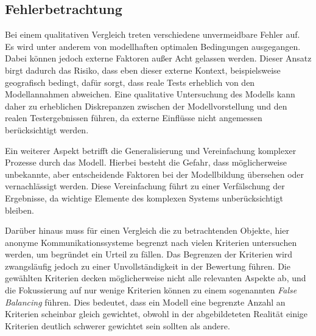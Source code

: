 \subsection{Fehlerbetrachtung}

Bei einem qualitativen Vergleich treten verschiedene unvermeidbare Fehler auf. Es wird unter anderem von modellhaften optimalen Bedingungen ausgegangen. Dabei können jedoch externe Faktoren außer Acht gelassen werden. Dieser Ansatz birgt dadurch das Risiko, dass eben dieser externe Kontext, beispielsweise geografisch bedingt, dafür sorgt, dass reale Tests erheblich von den Modellannahmen abweichen. Eine qualitative Untersuchung des Modells kann daher zu erheblichen Diskrepanzen zwischen der Modellvorstellung und den realen Testergebnissen führen, da externe Einflüsse nicht angemessen berücksichtigt werden.

Ein weiterer Aspekt betrifft die Generalisierung und Vereinfachung komplexer Prozesse durch das Modell. Hierbei besteht die Gefahr, dass möglicherweise unbekannte, aber entscheidende Faktoren bei der Modellbildung übersehen oder vernachlässigt werden. Diese Vereinfachung führt zu einer Verfälschung der Ergebnisse, da wichtige Elemente des komplexen Systems unberücksichtigt bleiben\cite{DisadvantagesOfQualitativApproaches}.

Darüber hinaus muss für einen Vergleich die zu betrachtenden Objekte, hier anonyme Kommunikationssysteme begrenzt nach vielen Kriterien untersuchen werden, um begründet ein Urteil zu fällen. Das Begrenzen der Kriterien wird zwangsläufig jedoch zu einer Unvollständigkeit in der Bewertung führen. Die gewählten Kriterien decken möglicherweise nicht alle relevanten Aspekte ab, und die Fokussierung auf nur wenige Kriterien können zu einem sogenannten \textit{False Balancing} führen. Dies bedeutet, dass ein Modell eine begrenzte Anzahl an Kriterien scheinbar gleich gewichtet, obwohl in der abgebildeteten Realität einige Kriterien deutlich schwerer gewichtet sein sollten als andere.